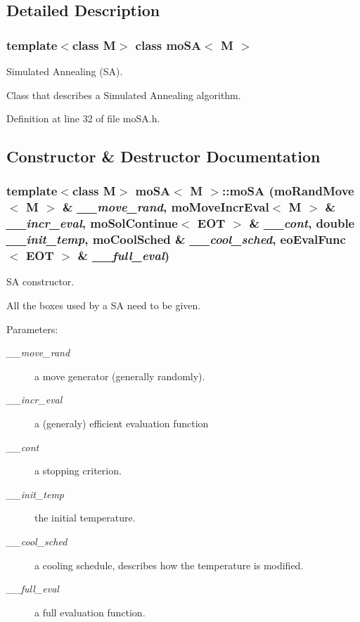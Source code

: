 \subsection{Detailed Description}
\subsubsection*{template$<$class M$>$ class mo\-SA$<$ M $>$}

Simulated Annealing (SA). 

Class that describes a Simulated Annealing algorithm. 



Definition at line 32 of file mo\-SA.h.

\subsection{Constructor \& Destructor Documentation}
\subsubsection{\setlength{\rightskip}{0pt plus 5cm}template$<$class M$>$ {\bf mo\-SA}$<$ M $>$::{\bf mo\-SA} ({\bf mo\-Rand\-Move}$<$ M $>$ \& {\em \_\-\_\-move\_\-rand}, {\bf mo\-Move\-Incr\-Eval}$<$ M $>$ \& {\em \_\-\_\-incr\_\-eval}, {\bf mo\-Sol\-Continue}$<$ {\bf EOT} $>$ \& {\em \_\-\_\-cont}, double {\em \_\-\_\-init\_\-temp}, {\bf mo\-Cool\-Sched} \& {\em \_\-\_\-cool\_\-sched}, eo\-Eval\-Func$<$ {\bf EOT} $>$ \& {\em \_\-\_\-full\_\-eval})\hspace{0.3cm}{\tt  [inline]}}\label{classmo_s_a_ef9ffb0d95c599e0a06c78db5f2f4b12}


SA constructor. 

All the boxes used by a SA need to be given.

\begin{Desc}
\item[Parameters:]
\begin{description}
\item[{\em \_\-\_\-move\_\-rand}]a move generator (generally randomly). \item[{\em \_\-\_\-incr\_\-eval}]a (generaly) efficient evaluation function \item[{\em \_\-\_\-cont}]a stopping criterion. \item[{\em \_\-\_\-init\_\-temp}]the initial temperature. \item[{\em \_\-\_\-cool\_\-sched}]a cooling schedule, describes how the temperature is modified. \item[{\em \_\-\_\-full\_\-eval}]a full evaluation function. \end{description}
\end{Desc}


